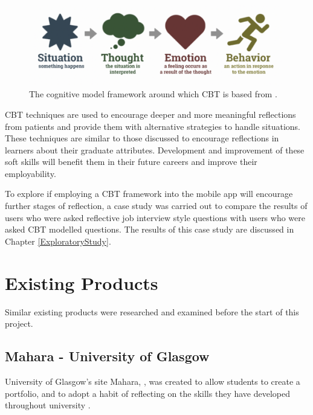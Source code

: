 \documentclass{l4proj}
\begin{document}
\begin{figure}[h!]
    \begin{centering}
    \includegraphics[scale=0.55]{images/cognitive-model.png}
    \caption{The cognitive model framework around which CBT is based from \citet{therapist_aid_psychoeducation}.}
    \label{fig: CognitiveModel}
    \end{centering}
\end{figure}

CBT techniques are used to encourage deeper and more meaningful reflections from patients and provide them with alternative strategies to handle situations. These techniques are similar to those discussed to encourage reflections in learners about their graduate attributes. Development and improvement of these soft skills will benefit them in their future careers and improve their employability.

To explore if employing a CBT framework into the mobile app will encourage further stages of reflection, a case study was carried out to compare the results of users who were asked reflective job interview style questions with users who were asked CBT modelled questions. The results of this case study are discussed in Chapter \ref{ExploratoryStudy}.

\section{Existing Products}

Similar existing products were researched and examined before the start of this project.

\subsection{Mahara - University of Glasgow}

University of Glasgow's site Mahara, \citep{mahara_dashboard}, was created to allow students to create a portfolio, and to adopt a habit of reflecting on the skills they have developed throughout university \citep{glasgow_university_attributes}.
\end{document}
